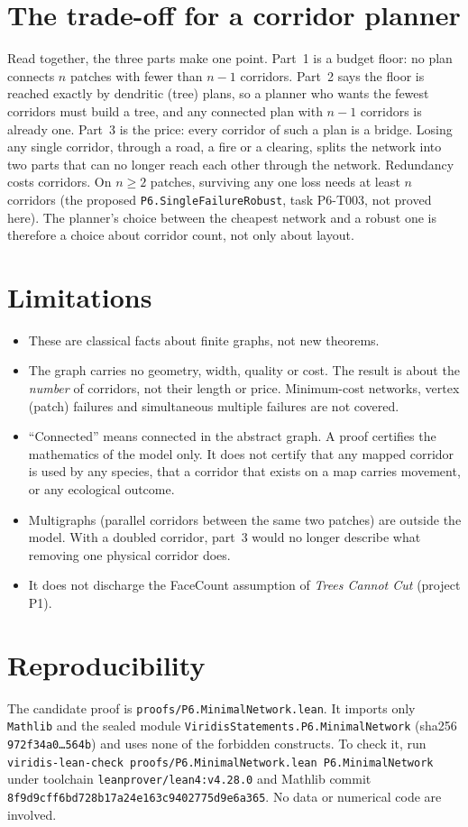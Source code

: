 \documentclass[11pt]{article}
\begin{document}
\section{The trade-off for a corridor planner}\label{sec:tradeoff}
Read together, the three parts make one point. Part~1 is a budget floor: no plan connects $n$ patches
with fewer than $n-1$ corridors. Part~2 says the floor is reached exactly by dendritic (tree) plans, so
a planner who wants the fewest corridors must build a tree, and any connected plan with $n-1$
corridors is already one. Part~3 is the price: every corridor of such a plan is a bridge. Losing any single
corridor, through a road, a fire or a clearing, splits the network into two parts that can no longer reach each other
through the network. Redundancy costs corridors. On $n\ge 2$ patches, surviving any one loss needs at least $n$ corridors
(the proposed \texttt{P6.SingleFailureRobust}, task P6-T003, not proved here). The planner's choice between
the cheapest network and a robust one is therefore a choice about corridor count, not only about layout.

\section{Limitations}
\begin{itemize}
\item These are classical facts about finite graphs, not new theorems.
\item The graph carries no geometry, width, quality or cost. The result is about the \emph{number} of
corridors, not their length or price. Minimum-cost networks, vertex (patch) failures and simultaneous
multiple failures are not covered.
\item ``Connected'' means connected in the abstract graph. A proof certifies the mathematics of the model
only. It does not certify that any mapped corridor is used by any species, that a corridor that exists on a map
carries movement, or any ecological outcome.
\item Multigraphs (parallel corridors between the same two patches) are outside the model. With a doubled
corridor, part~3 would no longer describe what removing one physical corridor does.
\item It does not discharge the FaceCount assumption of \emph{Trees Cannot Cut} (project P1).
\end{itemize}

\section{Reproducibility}
The candidate proof is \texttt{proofs/P6.MinimalNetwork.lean}. It imports only \texttt{Mathlib} and the sealed
module \texttt{ViridisStatements.P6.MinimalNetwork} (sha256 \texttt{972f34a0\ldots 564b}) and uses none
of the forbidden constructs. To check it, run
\texttt{viridis-lean-check proofs/P6.MinimalNetwork.lean P6.MinimalNetwork} under toolchain
\texttt{leanprover/lean4:v4.28.0} and Mathlib commit \texttt{8f9d9cff6bd728b17a24e163c9402775d9e6a365}.
No data or numerical code are involved.
\end{document}

